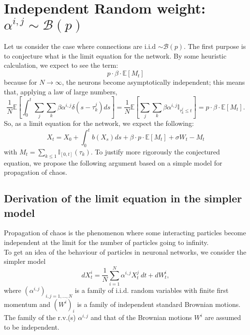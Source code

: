 \section{Independent Random weight: $\alpha^{i,j}\sim \mathcal{B}(p)$}
Let us consider the case where connections are i.i.d $\sim \mathcal{B}(p)$. The first purpose is to conjecture what is the limit equation for the network. By some heuristic calculation, we expect to see the term:
\[p\cdot \beta\cdot \mathbb{E}[{M_t}]\]
because for $N\rightarrow \infty$, the neurons become asymptotically independent; this means that, applying a law of large numbers,
\[\frac{1}{N}\mathbb{E}\left[\int_0^t\sum_j\sum_k\beta\alpha^{i,j}\delta(s-\tau^j_k)ds\right]=\frac{1}{N} \mathbb{E}\left[\sum_j\sum_k\beta\alpha^{i,j}\mathbb{I}_{\tau^j_k\leq t}\right]=p\cdot \beta\cdot \mathbb{E}[{M_t}]. \] 
So, as a limit equation for the network, we expect the following:
\[X_t=X_0+\int_0^t b(X_s)ds+\beta\cdot p\cdot\mathbb{E}[M_t]+\sigma W_t-M_t\]
with $M_t=\sum_{k\leq 1}\mathbb{I}_{[0,t]}(\tau_k)$.
To justify more rigorously the conjectured equation, we propose the following argument based on a simple model for propagation of chaos. 
\subsection{Derivation of the limit equation in the simpler model}
Propagation of chaos is the phenomenon where some interacting particles become independent at the limit for the number of particles going to infinity. \\
To get an idea of the behaviour of particles in neuronal networks, we consider the simpler model
\begin{equation} \label{SDE} dX^i_t = \frac{1}{N} \sum_{i = 1}^N \alpha^{i, j} X^j_t \ dt + dW^i_t, \end{equation} where $(\alpha^{i, j})_{i, j = 1, ..., N}$ is a family of i.i.d. random variables with finite first momentum and $(W^i)_i$ is a family of independent standard Brownian motions. The family of the r.v.(s) $\alpha^{i, j}$ and that of the Brownian motions $W^i$ are assumed to be independent. \\

